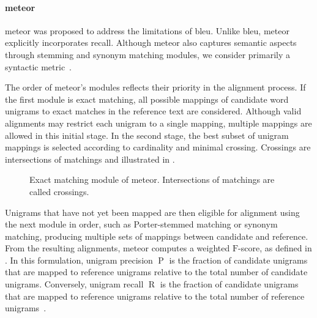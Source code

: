 
\paragraph{\acs{meteor}}
\ac{meteor} was proposed to address the limitations of \ac{bleu}. 
Unlike \ac{bleu}, \ac{meteor} explicitly incorporates recall. 
Although \ac{meteor} also captures semantic aspects through stemming and synonym matching modules, we consider  primarily a syntactic metric~\citep{kurt_pehlivanoglu_comparative_2024}. 

The order of \ac{meteor}'s modules reflects their priority in the alignment process. 
If the first module is exact matching, all possible mappings of candidate word unigrams to exact matches in the reference text are considered. 
Although valid alignments may restrict each unigram to a single mapping, multiple mappings are allowed in this initial stage. 
In the second stage, the best subset of unigram mappings is selected according to cardinality and minimal crossing.
Crossings are intersections of matchings and illustrated in .

\begin{figure}[h]
    \centering
    \caption[Exact matching module]{Exact matching module of \ac{meteor}. Intersections of matchings are called crossings.}
    \label{fig:meteor_crossings}
\end{figure}

Unigrams that have not yet been mapped are then eligible for alignment using the next module in order, such as Porter-stemmed matching or synonym matching, producing multiple sets of mappings between candidate and reference. 
From the resulting alignments, \ac{meteor} computes a weighted $\mathrm{F}$-score, as defined in . 
In this formulation, unigram precision $\operatorname{P}$ is the fraction of candidate unigrams that are mapped to reference unigrams relative to the total number of candidate unigrams. 
Conversely, unigram recall $\operatorname{R}$ is the fraction of candidate unigrams that are mapped to reference unigrams relative to the total number of reference unigrams~\citep{banerjee_METEOR_2005}.

